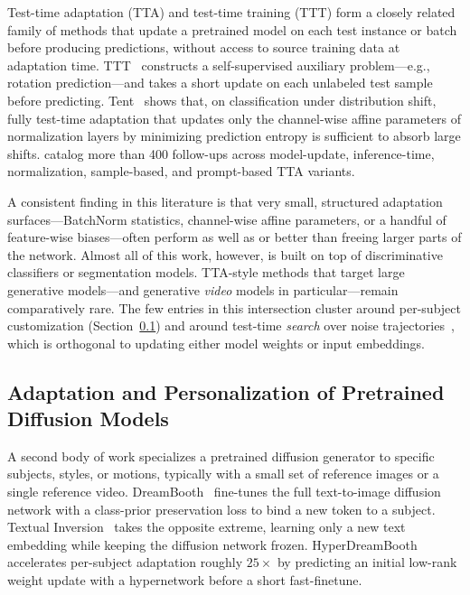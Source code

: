 Test-time adaptation (TTA) and test-time training (TTT) form a closely
related family of methods that update a pretrained model on each test
instance or batch before producing predictions, without access to source
training data at adaptation time. TTT~\citep{sun2020ttt} constructs a
self-supervised auxiliary problem---e.g., rotation prediction---and takes a
short update on each unlabeled test sample before predicting.
Tent~\citep{wang2021tent} shows that, on classification under distribution
shift, fully test-time adaptation that updates only the channel-wise affine
parameters of normalization layers by minimizing prediction entropy is
sufficient to absorb large shifts. \citet{xiao2024ttasurvey} catalog more
than 400 follow-ups across model-update, inference-time, normalization,
sample-based, and prompt-based TTA variants.

A consistent finding in this literature is that very small, structured
adaptation surfaces---BatchNorm statistics, channel-wise affine parameters,
or a handful of feature-wise biases---often perform as well as or better
than freeing larger parts of the network. Almost all of this work, however,
is built on top of discriminative classifiers or segmentation models.
TTA-style methods that target large generative models---and generative
\emph{video} models in particular---remain comparatively rare. The few
entries in this intersection cluster around per-subject customization
(Section~\ref{sec:rw_personalization}) and around test-time \emph{search}
over noise trajectories~\citep{liu2025videoT1}, which is orthogonal to
updating either model weights or input embeddings.

\subsection{Adaptation and Personalization of Pretrained Diffusion Models}
\label{sec:rw_personalization}

A second body of work specializes a pretrained diffusion generator to
specific subjects, styles, or motions, typically with a small set of
reference images or a single reference video.
DreamBooth~\citep{ruiz2023dreambooth} fine-tunes the full text-to-image
diffusion network with a class-prior preservation loss to bind a new token
to a subject. Textual Inversion~\citep{gal2023textualinversion} takes the
opposite extreme, learning only a new text embedding while keeping the
diffusion network frozen. HyperDreamBooth~\citep{ruiz2024hyperdreambooth}
accelerates per-subject adaptation roughly $25\times$ by predicting an
initial low-rank weight update with a hypernetwork before a short
fast-finetune.

